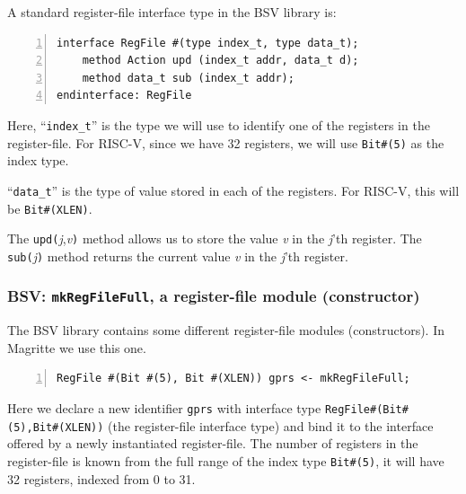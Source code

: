 

A standard register-file interface type in the BSV library is:

\begin{Verbatim}[frame=single, numbers=left]
interface RegFile #(type index_t, type data_t);
    method Action upd (index_t addr, data_t d);
    method data_t sub (index_t addr);
endinterface: RegFile
\end{Verbatim}

Here, ``\verb|index_t|'' is the type we will use to identify one of
the registers in the register-file.  For RISC-V, since we have 32
registers, we will use \verb|Bit#(5)| as the index type.

``\verb|data_t|'' is the type of value stored in each of the
registers.  For RISC-V, this will be \verb|Bit#(XLEN)|.

The \verb|upd(|\emph{j},\emph{v}\verb|)| method allows us to store the
value \emph{v} in the \emph{j}'th register.  The
\verb|sub(|\emph{j}\verb|)| method returns the current value \emph{v}
in the \emph{j}'th register.


\subsubsection{BSV: {\tt mkRegFileFull}, a register-file module (constructor)}


The BSV library contains some different register-file modules
(constructors). In Magritte we use this one.


\begin{Verbatim}[frame=single, numbers=left]
   RegFile #(Bit #(5), Bit #(XLEN)) gprs <- mkRegFileFull;
\end{Verbatim}

Here we declare a new identifier \verb|gprs| with interface type
\verb|RegFile#(Bit#(5),Bit#(XLEN))| (the register-file interface type)
and bind it to the interface offered by a newly instantiated
register-file.  The number of registers in the register-file is known
from the full range of the index type \verb|Bit#(5)|, {\ie} it will
have 32 registers, indexed from 0 to 31.


